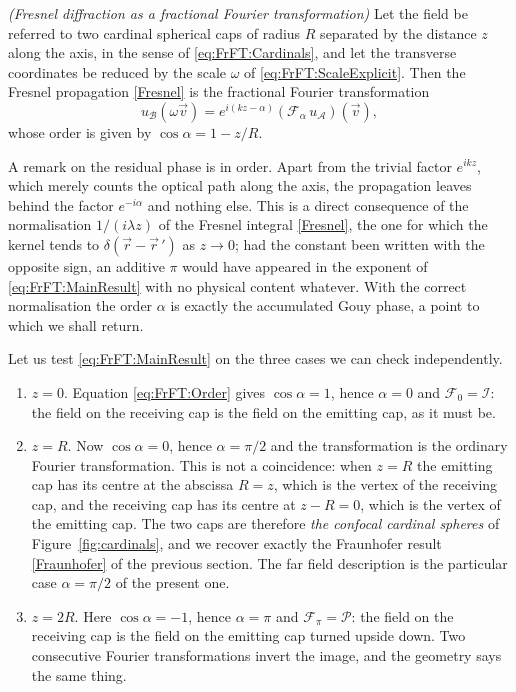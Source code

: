 			\begin{myteo}
				\textit{(Fresnel diffraction as a fractional Fourier transformation)} Let the field be referred to two cardinal spherical caps of radius $R$ separated by the distance $z$ along the axis, in the sense of \eqref{eq:FrFT:Cardinals}, and let the transverse coordinates be reduced by the scale $\omega$ of \eqref{eq:FrFT:ScaleExplicit}. Then the Fresnel propagation \eqref{Fresnel} is the fractional Fourier transformation
				\begin{equation}\label{eq:FrFT:MainResult}
					u_{\mathcal{B}}(\omega\vec{v}) = e^{i\left(kz - \alpha\right)}\left(\mathcal{F}_{\alpha}\,u_{\mathcal{A}}\right)(\vec{v}),
				\end{equation}
				whose order is given by $\cos\alpha = 1 - z/R$.
			\end{myteo}

			A remark on the residual phase is in order. Apart from the trivial factor $e^{ikz}$, which merely counts the optical path along the axis, the propagation leaves behind the factor $e^{-i\alpha}$ and nothing else. This is a direct consequence of the normalisation $1/(i\lambda z)$ of the Fresnel integral \eqref{Fresnel}, the one for which the kernel tends to $\delta(\vec{r}-\vec{r}\,')$ as $z\to0$; had the constant been written with the opposite sign, an additive $\pi$ would have appeared in the exponent of \eqref{eq:FrFT:MainResult} with no physical content whatever. With the correct normalisation the order $\alpha$ is exactly the accumulated Gouy phase, a point to which we shall return.

			Let us test \eqref{eq:FrFT:MainResult} on the three cases we can check independently.

			\begin{enumerate}
				\item $z = 0$. Equation \eqref{eq:FrFT:Order} gives $\cos\alpha = 1$, hence $\alpha = 0$ and $\mathcal{F}_{0} = \mathcal{I}$: the field on the receiving cap is the field on the emitting cap, as it must be.
				\item $z = R$. Now $\cos\alpha = 0$, hence $\alpha = \pi/2$ and the transformation is the ordinary Fourier transformation. This is not a coincidence: when $z=R$ the emitting cap has its centre at the abscissa $R = z$, which is the vertex of the receiving cap, and the receiving cap has its centre at $z-R = 0$, which is the vertex of the emitting cap. The two caps are therefore \textit{the confocal cardinal spheres} of Figure~\ref{fig:cardinals}, and we recover exactly the Fraunhofer result \eqref{Fraunhofer} of the previous section. The far field description is the particular case $\alpha = \pi/2$ of the present one.
				\item $z = 2R$. Here $\cos\alpha = -1$, hence $\alpha = \pi$ and $\mathcal{F}_{\pi} = \mathcal{P}$: the field on the receiving cap is the field on the emitting cap turned upside down. Two consecutive Fourier transformations invert the image, and the geometry says the same thing.
			\end{enumerate}

